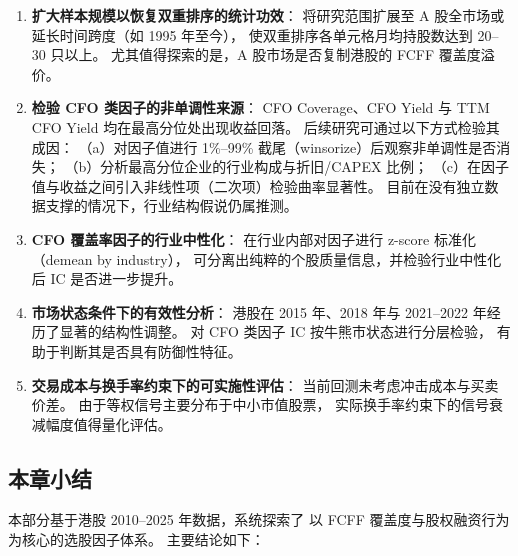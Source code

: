 \documentclass[a4paper,10pt]{article}
\begin{document}
\begin{enumerate}[leftmargin=2em]
    \item \textbf{扩大样本规模以恢复双重排序的统计功效}：
    将研究范围扩展至 A 股全市场或延长时间跨度（如 1995 年至今），
    使双重排序各单元格月均持股数达到 20--30 只以上。
    尤其值得探索的是，A 股市场是否复制港股的 FCFF 覆盖度溢价。

    \item \textbf{检验 CFO 类因子的非单调性来源}：
    CFO Coverage、CFO Yield 与 TTM CFO Yield 均在最高分位处出现收益回落。
    后续研究可通过以下方式检验其成因：
    （a）对因子值进行 1\%--99\% 截尾（winsorize）后观察非单调性是否消失；
    （b）分析最高分位企业的行业构成与折旧/CAPEX 比例；
    （c）在因子值与收益之间引入非线性项（二次项）检验曲率显著性。
    目前在没有独立数据支撑的情况下，行业结构假说仍属推测。

    \item \textbf{CFO 覆盖率因子的行业中性化}：
    在行业内部对因子进行 z-score 标准化（demean by industry），
    可分离出纯粹的个股质量信息，并检验行业中性化后 IC 是否进一步提升。

    \item \textbf{市场状态条件下的有效性分析}：
    港股在 2015 年、2018 年与 2021--2022 年经历了显著的结构性调整。
    对 CFO 类因子 IC 按牛熊市状态进行分层检验，
    有助于判断其是否具有防御性特征。

    \item \textbf{交易成本与换手率约束下的可实施性评估}：
    当前回测未考虑冲击成本与买卖价差。
    由于等权信号主要分布于中小市值股票，
    实际换手率约束下的信号衰减幅度值得量化评估。
\end{enumerate}

\subsection{本章小结}

本部分基于港股 2010--2025 年数据，系统探索了
以 FCFF 覆盖度与股权融资行为为核心的选股因子体系。
主要结论如下：
\end{document}
